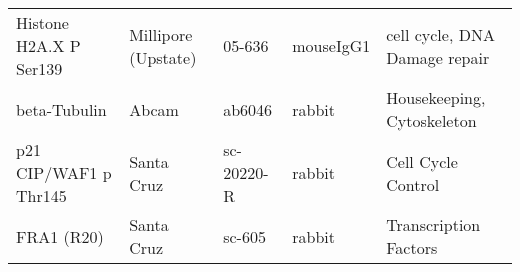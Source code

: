 \begin{tabular}{lllll}
                            Histone H2A.X P Ser139 &          Millipore (Upstate) &       05-636 &   mouseIgG1 &                      cell cycle, DNA Damage repair \\
                                      beta-Tubulin &                        Abcam &       ab6046 &      rabbit &                         Housekeeping, Cytoskeleton \\
                             p21 CIP/WAF1 p Thr145 &                   Santa Cruz &   sc-20220-R &      rabbit &                                 Cell Cycle Control \\
                                        FRA1 (R20) &                   Santa Cruz &       sc-605 &      rabbit &                              Transcription Factors \\
\bottomrule
\end{tabular}

